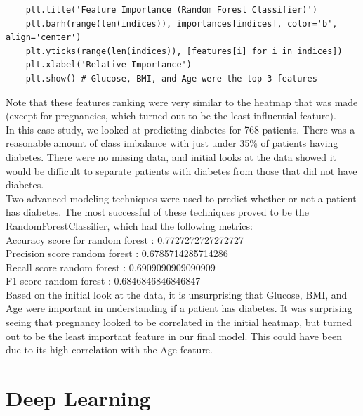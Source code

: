 \documentclass[11pt, a4paper]{article}
\begin{document}
\begin{spacing}{1.1}
\begin{lstlisting}
	plt.title('Feature Importance (Random Forest Classifier)')
	plt.barh(range(len(indices)), importances[indices], color='b', align='center')
	plt.yticks(range(len(indices)), [features[i] for i in indices])
	plt.xlabel('Relative Importance')
	plt.show() # Glucose, BMI, and Age were the top 3 features \end{lstlisting} \vspace*{3mm}
	Note that these features ranking were very similar to the heatmap that was made (except for pregnancies, which turned out to be the least influential feature). \vspace*{2mm}\\
	In this case study, we looked at predicting diabetes for 768 patients.  There was a reasonable amount of class imbalance with just under 35\% of patients having diabetes.  There were no missing data, and initial looks at the data showed it would be difficult to separate patients with diabetes from those that did not have diabetes. \vspace*{2mm}\\
	Two advanced modeling techniques were used to predict whether or not a patient has diabetes.  The most successful of these techniques proved to be the RandomForestClassifier, which had the following metrics: \\
	Accuracy score for random forest : 0.7727272727272727\\
	Precision score random forest : 0.6785714285714286\\
	Recall score random forest : 0.6909090909090909\\
	F1 score random forest : 0.6846846846846847\vspace*{1mm}\\
	Based on the initial look at the data, it is unsurprising that Glucose, BMI, and Age were important in understanding if a patient has diabetes. It was surprising seeing that pregnancy looked to be correlated in the initial heatmap, but turned out to be the least important feature in our final model. This could have been due to its high correlation with the Age feature. \newpage
	
	\section{Deep Learning}

\end{spacing}
\end{document}
